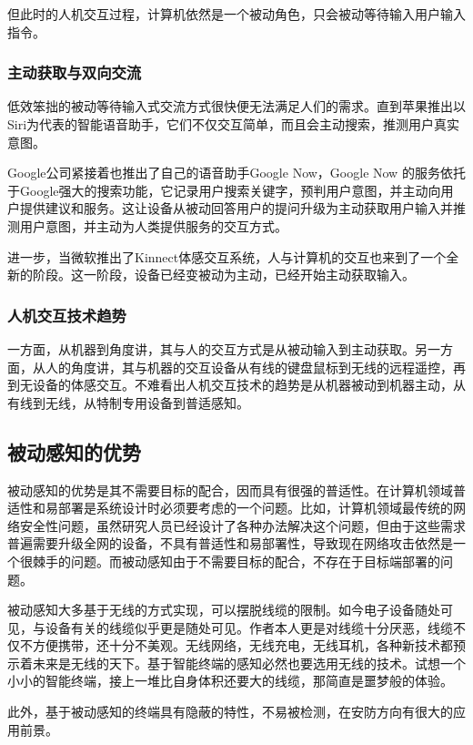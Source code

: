 但此时的人机交互过程，计算机依然是一个被动角色，只会被动等待输入用户输入指令。
\subsubsection{主动获取与双向交流}

低效笨拙的被动等待输入式交流方式很快便无法满足人们的需求。直到苹果推出以Siri为代表的智能语音助手，它们不仅交互简单，而且会主动搜索，推测用户真实意图。

Google公司紧接着也推出了自己的语音助手Google Now，Google Now 的服务依托于Google强大的搜索功能，它记录用户搜索关键字，预判用户意图，并主动向用户提供建议和服务。这让设备从被动回答用户的提问升级为主动获取用户输入并推测用户意图，并主动为人类提供服务的交互方式。

进一步，当微软推出了Kinnect体感交互系统，人与计算机的交互也来到了一个全新的阶段。这一阶段，设备已经变被动为主动，已经开始主动获取输入。

\subsubsection{人机交互技术趋势}

一方面，从机器到角度讲，其与人的交互方式是从被动输入到主动获取。另一方面，从人的角度讲，其与机器的交互设备从有线的键盘鼠标到无线的远程遥控，再到无设备的体感交互。不难看出人机交互技术的趋势是从机器被动到机器主动，从有线到无线，从特制专用设备到普适感知。

\subsection{被动感知的优势}
被动感知的优势是其不需要目标的配合，因而具有很强的普适性。在计算机领域普适性和易部署是系统设计时必须要考虑的一个问题。比如，计算机领域最传统的网络安全性问题，虽然研究人员已经设计了各种办法解决这个问题，但由于这些需求普遍需要升级全网的设备，不具有普适性和易部署性，导致现在网络攻击依然是一个很棘手的问题。而被动感知由于不需要目标的配合，不存在于目标端部署的问题。

被动感知大多基于无线的方式实现，可以摆脱线缆的限制。如今电子设备随处可见，与设备有关的线缆似乎更是随处可见。作者本人更是对线缆十分厌恶，线缆不仅不方便携带，还十分不美观。无线网络，无线充电，无线耳机，各种新技术都预示着未来是无线的天下。基于智能终端的感知必然也要选用无线的技术。试想一个小小的智能终端，接上一堆比自身体积还要大的线缆，那简直是噩梦般的体验。

此外，基于被动感知的终端具有隐蔽的特性，不易被检测，在安防方向有很大的应用前景。


